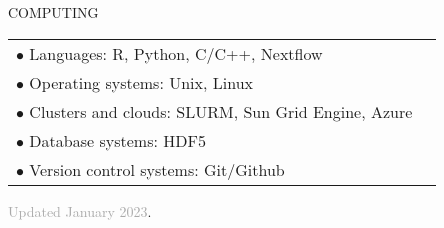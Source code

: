 \documentclass{resume} %
\begin{document}
\begin{rSection}{COMPUTING}
	
	\begin{tabular}{p{14cm}R{2.5cm}}
		$\bullet$ Languages:  R, Python, C/C++, Nextflow  &   \\ 
		$\bullet$ Operating systems: Unix, Linux & \\
		$\bullet$ Clusters and clouds: SLURM, Sun Grid Engine, Azure & \\
		$\bullet$ Database systems: HDF5 & \\
		$\bullet$ Version control systems: Git/Github
	\end{tabular} 
	
\end{rSection}

\textcolor{darkgray}{Updated January 2023}.
\end{document}
